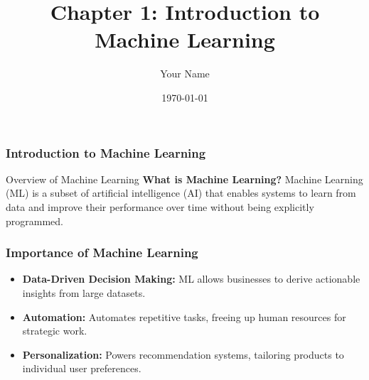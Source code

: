 \documentclass{beamer}
\title{Chapter 1: Introduction to Machine Learning}
\author{Your Name}
\institute{Your Institution}
\date{\today}
\begin{document}
\frame{\titlepage}

\begin{frame}[fragile]
    \frametitle{Introduction to Machine Learning}
    \begin{block}{Overview of Machine Learning}
        \textbf{What is Machine Learning?}
        Machine Learning (ML) is a subset of artificial intelligence (AI) that enables systems to learn from data and improve their performance over time without being explicitly programmed.
    \end{block}
\end{frame}

\begin{frame}[fragile]
    \frametitle{Importance of Machine Learning}
    \begin{itemize}
        \item \textbf{Data-Driven Decision Making:} ML allows businesses to derive actionable insights from large datasets.
        \item \textbf{Automation:} Automates repetitive tasks, freeing up human resources for strategic work.
        \item \textbf{Personalization:} Powers recommendation systems, tailoring products to individual user preferences.
    \end{itemize}
\end{frame}
\end{document}
